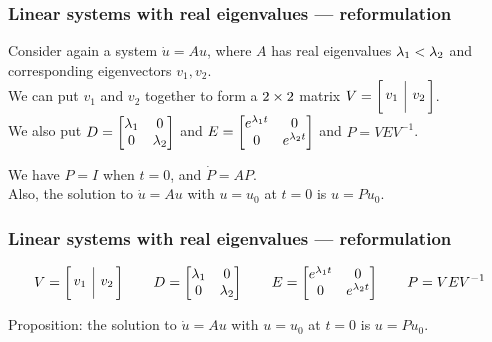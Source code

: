 \documentclass[9pt]{beamer}
\begin{document}
\begin{frame}[t]
 \frametitle{Linear systems with real eigenvalues --- reformulation}

 Consider again a system $\dot{u}=Au$, where $A$ has real eigenvalues
 $\lambda_1<\lambda_2$ and corresponding eigenvectors $v_1,v_2$.\\ \pause
 We can put $v_1$ and $v_2$ together to form a $2\times 2$ matrix $V=\barmat{v_1}{v_2}$.\\
 \pause
 We also put 
 $ D = \left[\begin{matrix} \lambda_1 & 0 \\ 0 & \lambda_2 \end{matrix}\right] $
 and 
 $ E = \left[\begin{matrix} e^{\lambda_1t} & 0 \\ 0 & e^{\lambda_2t} \end{matrix}\right]$ 
 and $P=VEV^{-1}$.\\

 \bigskip\pause

 \begin{proposition*}{}
  We have $P=I$ when $t=0$, and $\dot{P}=AP$.  \\ \pause
  Also, the solution to $\dot{u}=Au$ with $u=u_0$ at $t=0$ is $u=Pu_0$.
 \end{proposition*}
\end{frame}

\begin{frame}[t]
 \frametitle{Linear systems with real eigenvalues --- reformulation}

 \[ V = \barmat{v_1}{v_2} \qquad
    D = \bbm \lm_1 & 0 \\ 0 & \lm_2 \ebm \qquad
    E = \bbm e^{\lm_1t} & 0 \\ 0 & e^{\lm_2t} \ebm \qquad
    P = VEV^{-1}
 \]

 Proposition: the solution to $\dot{u}=Au$ with $u=u_0$ at $t=0$ is $u=Pu_0$.

 \reminderbar



\end{frame}
\end{document}
